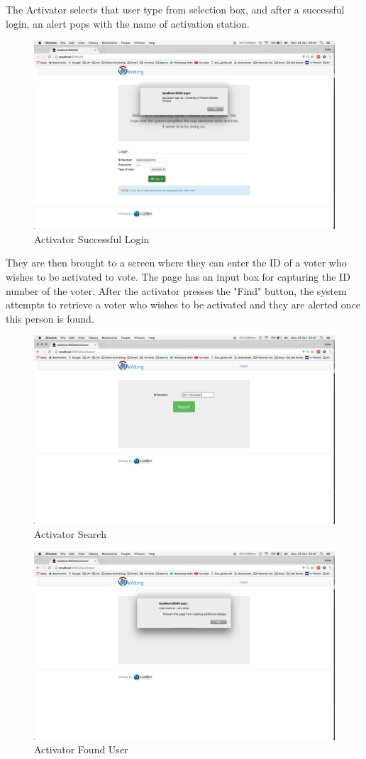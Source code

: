 \documentclass[11pt]{article}
\begin{document}
		The Activator selects that user type from selection box, and after a successful login, an alert pops with the name of activation station.
		\begin{figure}[H]
			\centering
			\includegraphics[width=0.7\linewidth]{../Images/UserManual/activatorWeb/activatorsuccessfullogin.png}
			\caption{Activator Successful Login}
		\end{figure}
		\newpage
		They are then brought to a screen where they can enter the ID of a voter who wishes to be activated to vote.
		The page has an input box for capturing the ID number of the voter. 
		After the activator presses the "Find" button, the system attempts to retrieve a voter who wishes to be activated and they are alerted once this person is found.
		\begin{figure}[H]
			\centering
			\includegraphics[width=0.7\linewidth]{../Images/UserManual/activatorWeb/activatorsearch.png}
			\caption{Activator Search}
		\end{figure}
		\begin{figure}[H]
			\centering
			\includegraphics[width=0.7\linewidth]{../Images/UserManual/activatorWeb/activatorfound.png}
			\caption{Activator Found User}
		\end{figure}
\end{document}
